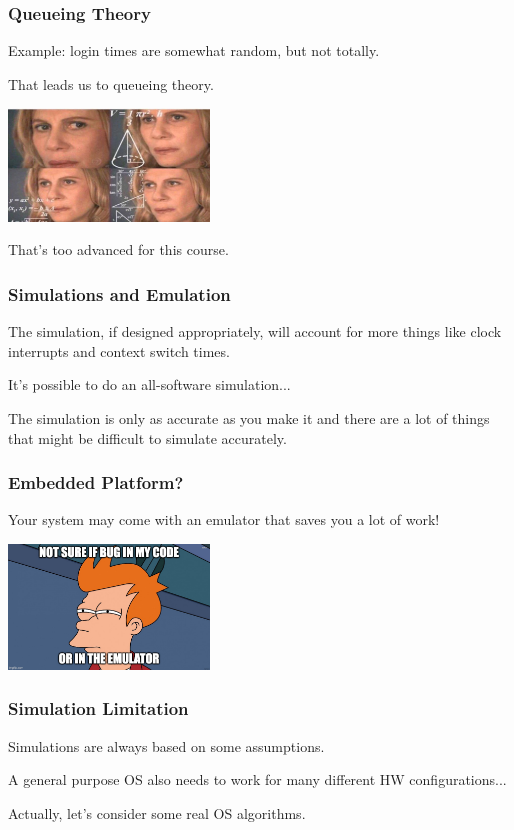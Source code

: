 \begin{frame}
\frametitle{Queueing Theory}

Example: login times are somewhat random, but not totally.

That leads us to queueing theory.

\begin{center}
	\includegraphics[width=0.4\textwidth]{images/math.jpg}
\end{center}

That's too advanced for this course.

\end{frame}

\begin{frame}
\frametitle{Simulations and Emulation}

The simulation, if designed appropriately, will account for more things like clock interrupts and context switch times.

It's possible to do an all-software simulation...

The simulation is only as accurate as you make it and there are a lot of things that might be difficult to simulate accurately.

\end{frame}

\begin{frame}
\frametitle{Embedded Platform?}

Your system may come with an emulator that saves you a lot of work!

\begin{center}
	\includegraphics[width=0.4\textwidth]{images/emulator.jpg}
\end{center}

\end{frame}

\begin{frame}
\frametitle{Simulation Limitation}

Simulations are always based on some assumptions.

A general purpose OS also needs to work for many different HW configurations...

Actually, let's consider some real OS algorithms.

\end{frame}


